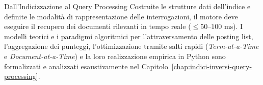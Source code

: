 \begin{noteblock}{Dall'Indicizzazione al Query Processing}
Costruite le strutture dati dell'indice e definite le modalit\`a di rappresentazione delle interrogazioni, il motore deve eseguire il recupero dei documenti rilevanti in tempo reale ($\le 50\text{--}100\text{ ms}$). I modelli teorici e i paradigmi algoritmici per l'attraversamento delle posting list, l'aggregazione dei punteggi, l'ottimizzazione tramite salti rapidi (\textit{Term-at-a-Time} e \textit{Document-at-a-Time}) e la loro realizzazione empirica in Python sono formalizzati e analizzati esaustivamente nel Capitolo~\ref{chap:indici-inversi-query-processing}.
\end{noteblock}
